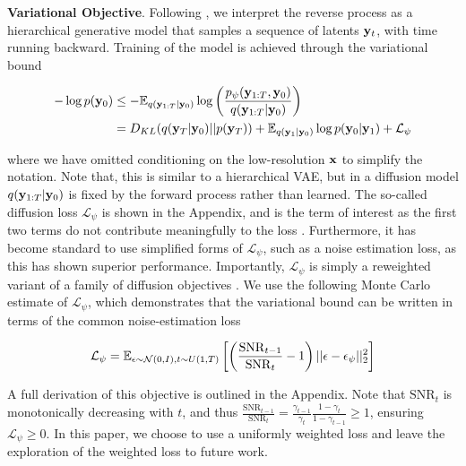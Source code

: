 \textbf{Variational Objective}. Following \parencite{Kingma2021}, we interpret the reverse process as a hierarchical generative model that samples a sequence of latents $\bold{y}_{t}$, with time running backward. Training of the model is achieved through the variational bound

\begin{align}
-\log p(\bold{y}_{0}) &\leq -\mathbb{E}_{q(\bold{y}_{1:T}\lvert\bold{y}_{0})} \log \left(\frac{p_{\psi}(\bold{y}_{1:T},\bold{y}_{0})}{q(\bold{y}_{1:T}\lvert\bold{y}_{0})}\right) \\
&=  D_{KL}(q(\bold{y}_{T}\lvert\bold{y}_{0}) \lvert\lvert p(\bold{y}_{T})) + \mathbb{E}_{q(\bold{y}_{1}\lvert\bold{y}_{0})} \log p(\bold{y}_{0}\lvert\bold{y}_{1}) + \mathcal{L}_{\psi}
\end{align}

where we have omitted conditioning on the low-resolution $\bold{x}$ to simplify the notation. Note that, this is similar to a hierarchical VAE, but in a diffusion model $q(\bold{y}_{1:T}\lvert\bold{y}_{0})$ is fixed by the forward process rather than learned. The so-called diffusion loss $\mathcal{L}_{\psi}$ is shown in the Appendix, and is the term of interest as the first two terms do not contribute meaningfully to the loss \parencite{Ho2020}. Furthermore, it has become standard to use simplified forms of $\mathcal{L}_{\psi}$, such as a noise estimation loss, as this has shown superior performance. Importantly, $\mathcal{L}_{\psi}$ is simply a reweighted variant of a family of diffusion objectives \parencite{Kingma2021,Kingma2023}. We use the following Monte Carlo estimate of $\mathcal{L}_{\psi}$, which demonstrates that the variational bound can be written in terms of the common noise-estimation loss


\begin{equation}
\mathcal{L}_{\psi} = \mathbb{E}_{\epsilon\sim \mathcal{N}(0,I),t\sim U(1,T)}\left[\left(\frac{\mathrm{SNR}_{t-1}}{{\mathrm{SNR}_{t}}}-1\right)\lvert\lvert \bold{\epsilon}-\bold{\epsilon}_{\psi}\lvert\lvert_{2}^{2}\right]
\end{equation}

A full derivation of this objective is outlined in the Appendix. Note that $\mathrm{SNR}_{t}$ is monotonically decreasing with $t$, and thus $\frac{\mathrm{SNR}_{t-1}}{{\mathrm{SNR}_{t}}} = \frac{\gamma_{t-1}}{\gamma_{t}}\frac{1-\gamma_{t}}{1-\gamma_{t-1}} \geq 1$, ensuring $\mathcal{L}_{\psi}\geq 0$. In this paper, we choose to use a uniformly weighted loss and leave the exploration of the weighted loss to future work.

